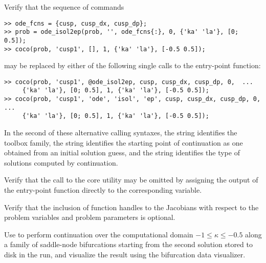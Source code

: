 \begin{exercises}
\item Verify that the sequence of commands
\begin{lstlisting}[language=coco-highlight]
>> ode_fcns = {cusp, cusp_dx, cusp_dp};
>> prob = ode_isol2ep(prob, '', ode_fcns{:}, 0, {'ka' 'la'}, [0; 0.5]);
>> coco(prob, 'cusp1', [], 1, {'ka' 'la'}, [-0.5 0.5]);
\end{lstlisting}
may be replaced by either of the following single calls to the  entry-point function:
\begin{lstlisting}[language=coco-highlight]
>> coco(prob, 'cusp1', @ode_isol2ep, cusp, cusp_dx, cusp_dp, 0,  ...
     {'ka' 'la'}, [0; 0.5], 1, {'ka' 'la'}, [-0.5 0.5]);
>> coco(prob, 'cusp1', 'ode', 'isol', 'ep', cusp, cusp_dx, cusp_dp, 0, ...
     {'ka' 'la'}, [0; 0.5], 1, {'ka' 'la'}, [-0.5 0.5]);
\end{lstlisting}
In the second of these alternative calling syntaxes, the string  identifies the toolbox family, the string  identifies the starting point of continuation as one obtained from an initial solution guess, and the string  identifies the type of solutions computed by continuation.

\item Verify that the call to the  core utility may be omitted by assigning the output of the  entry-point function directly to the corresponding variable.

\item Verify that the inclusion of function handles to the Jacobians with respect to the problem variables and problem parameters is optional.

\item Use  to perform continuation over the computational domain $-1\le\kappa\le -0.5$ along a family of saddle-node bifurcations starting from the second solution stored to disk in the  run, and visualize the result using the  bifurcation data visualizer.
\end{exercises}

